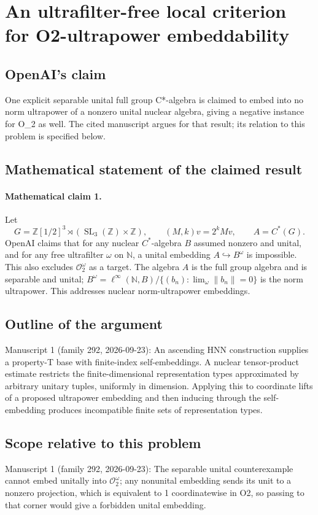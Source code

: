 \documentclass[11pt]{article}
\begin{document}
\section*{An ultrafilter-free local criterion for O2-ultrapower embeddability}

\subsection{OpenAI's claim}
One explicit separable unital full group C*-algebra is claimed to embed into no norm ultrapower of a nonzero unital nuclear algebra, giving a negative instance for O\_2 as well. The cited manuscript argues for that result; its relation to this problem is specified below.

\subsection{Mathematical statement of the claimed result}
\paragraph{Mathematical claim 1.} Let
\[
G=\mathbb Z[1/2]^3\rtimes(\operatorname{SL}_3(\mathbb Z)\times\mathbb Z),\qquad (M,k)v=2^kMv,\qquad A=C^*(G).
\]
OpenAI claims that for any nuclear $C^*$-algebra $B$ assumed nonzero and unital, and for any free ultrafilter $\omega$ on $\mathbb N$, a unital embedding $A\hookrightarrow B^\omega$ is impossible. This also excludes $\mathcal O_2^\omega$ as a target. The algebra $A$ is the full group algebra and is separable and unital; $B^\omega=\ell^\infty(\mathbb N,B)/\{(b_n):\lim_\omega\|b_n\|=0\}$ is the norm ultrapower. This addresses nuclear norm-ultrapower embeddings.

\subsection{Outline of the argument}
Manuscript 1 (family 292, 2026-09-23): An ascending HNN construction supplies a property-T base with finite-index self-embeddings. A nuclear tensor-product estimate restricts the finite-dimensional representation types approximated by arbitrary unitary tuples, uniformly in dimension. Applying this to coordinate lifts of a proposed ultrapower embedding and then inducing through the self-embedding produces incompatible finite sets of representation types.

\subsection{Scope relative to this problem}
Manuscript 1 (family 292, 2026-09-23): The separable unital counterexample cannot embed unitally into \(\mathcal O_2^\omega\); any nonunital embedding sends its unit to a nonzero projection, which is equivalent to 1 coordinatewise in O2, so passing to that corner would give a forbidden unital embedding.
\end{document}
